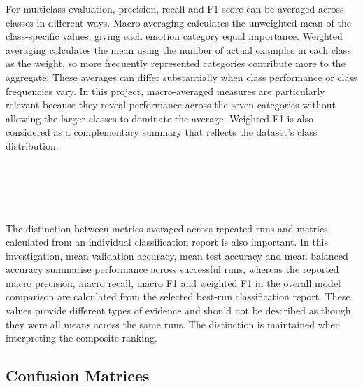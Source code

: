 \documentclass[12pt, a4paper]{report}
\let\oldsubsection\subsection
\renewcommand{\subsection}{%
    \Needspace{6\baselineskip}%
    \oldsubsection
}
\begin{document}
				For multiclass evaluation, precision, recall and F1-score can be averaged across classes in different ways. Macro averaging calculates the unweighted mean of the class-specific values, giving each emotion category equal importance. Weighted averaging calculates the mean using the number of actual examples in each class as the weight, so more frequently represented categories contribute more to the aggregate. These averages can differ substantially when class performance or class frequencies vary. In this project, macro-averaged measures are particularly relevant because they reveal performance across the seven categories without allowing the larger classes to dominate the average. Weighted F1 is also considered as a complementary summary that reflects the dataset's class distribution.\\\\\\\\\\\\
				The distinction between metrics averaged across repeated runs and metrics calculated from an individual classification report is also important. In this investigation, mean validation accuracy, mean test accuracy and mean balanced accuracy summarise performance across successful runs, whereas the reported macro precision, macro recall, macro F1 and weighted F1 in the overall model comparison are calculated from the selected best-run classification report. These values provide different types of evidence and should not be described as though they were all means across the same runs. The distinction is maintained when interpreting the composite ranking.
				
			\subsection{Confusion Matrices}
				
\end{document}
